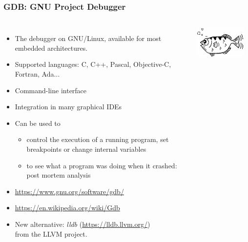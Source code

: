 \begin{frame}
  \frametitle{GDB: GNU Project Debugger}
  \fontsize{11}{11}\selectfont
  \begin{columns}[T]
    \begin{itemize}
    \item The debugger on GNU/Linux, available for most embedded
      architectures.
    \item Supported languages: C, C++, Pascal, Objective-C, Fortran,
      Ada...
    \item Command-line interface
    \item Integration in many graphical IDEs
    \item Can be used to
      \begin{itemize}
      \item control the execution of a running program, set
        breakpoints or change internal variables
      \item to see what a program was doing when it crashed: post
        mortem analysis
      \end{itemize}
    \item \url{https://www.gnu.org/software/gdb/}
    \item \url{https://en.wikipedia.org/wiki/Gdb}
    \item New alternative: {\em lldb} (\url{https://lldb.llvm.org/})\\
      from the LLVM project.
    \end{itemize}
    \includegraphics[width=0.9\textwidth]{common/gdb.png}
  \end{columns}
\end{frame}

